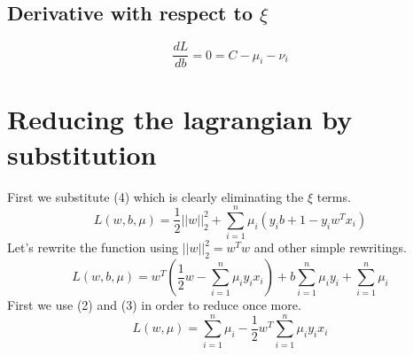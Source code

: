 \documentclass[a4paper,11pt]{article}
\begin{document}
\subsection{Derivative with respect to $\xi$}
  \begin{equation}
    \frac{dL}{db} = 0 = C - \mu_i - \nu_i
  \end{equation}

\section{Reducing the lagrangian by substitution}
First we substitute (4) which is clearly eliminating the $\xi$ terms.
\begin{equation}
  L(w, b, \mu) = \frac{1}{2} ||w||^2_2 + \sum\limits_{i=1}^n {\mu_i(y_ib + 1 - y_iw^Tx_i)}
\end{equation}
Let's rewrite the function using $ ||w||^2_2 = w^Tw $ and other simple rewritings.
\begin{equation}
  L(w, b, \mu) = w^T(\frac{1}{2}w - \sum\limits_{i=1}^n {\mu_iy_ix_i}) + b\sum\limits_{i=1}^n {\mu_iy_i} + \sum\limits_{i=1}^n {\mu_i}
\end{equation}
First we use (2) and (3) in order to reduce once more.
\begin{equation}
  L(w, \mu) = \sum\limits_{i=1}^n {\mu_i} - \frac{1}{2} w^T \sum\limits_{i=1}^n{\mu_iy_ix_i} 
\end{equation}
\end{document}
